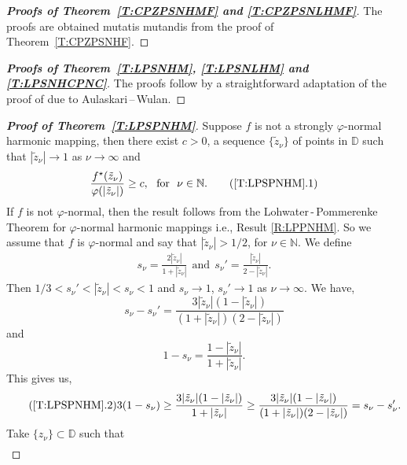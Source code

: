 \documentclass[11pt, reqno]{amsart}
\theoremstyle{definition}
\theoremstyle{remark}
\numberwithin{equation}{section}
\begin{document}
\begin{proof}[{\bf Proofs of Theorem~\ref{T:CPZPSNHMF} and \ref{T:CPZPSNLHMF}}]
The proofs are obtained mutatis mutandis from the 
proof of Theorem~\ref{T:CPZPSNHF}.
\end{proof}
\begin{proof}[{\bf Proofs of Theorem~\ref{T:LPSNHM}, \ref{T:LPSNLHM} and \ref{T:LPSNHCPNC}}]
The proofs follow by a straightforward adaptation of 
the proof of \cite[Theorem 1]{aulaskari-avotlptfsnf-2001} due to Aulaskari\,--\,Wulan.
\end{proof}
\begin{proof}[{\bf Proof of Theorem~\ref{T:LPSPNHM}}]
Suppose $f$ is not a strongly $\varphi$-normal harmonic mapping, then there exist $c>0$, a sequence 
$\{\tilde{z}_{\nu}\}$ of points in $\mathbb D$ such that $|\tilde{z}_{\nu}|\to1$ as $\nu\to\infty$ and 
\begin{equation}\frac{f^\star(\tilde{z}_{\nu})}{\varphi(|\tilde{z}_{\nu}|)}\geq c,\ 
\text{ for }\ \nu\in\mathbb N.\label{LPSPNHM.1}\tag{\ref*{T:LPSPNHM}.1} 
\end{equation}
If $f$ is not $\varphi$-normal, then the result follows from the Lohwater\,-\,Pommerenke Theorem for $\varphi$-normal harmonic mappings i.e., Result 
\ref{R:LPPNHM}. So we assume that $f$ is $\varphi$-normal and say that $|\tilde{z}_{\nu}|>1/2$, for $\nu\in\mathbb N$. We define
\begin{align*}
s_{\nu}=\frac{2|\tilde{z}_{\nu}|}{1+|\tilde{z}_{\nu}|}\ \ \text{and}\ \  s_{\nu}'=\frac{|\tilde{z}_{\nu}|}{2 -|\tilde{z}_{\nu}|}.
\end{align*}
Then $1/3<s_{\nu}'<|\tilde{z}_{\nu}|<s_{\nu}<1$ and $s_{\nu}\to 1$, $s_{\nu}'\to 1$ as $\nu\to \infty$.         
We have,
\begin{equation*}
s_{\nu}-s_{\nu}'=\frac{3|\tilde{z}_{\nu}|(1-|\tilde{z}_{\nu}|)}{(1+|\tilde{z}_{\nu}|)(2-|\tilde{z}_{\nu}|)}
\end{equation*}
and
\begin{equation*}
1-s_{\nu}=\frac{1-|\tilde{z}_{\nu}|}{1+|\tilde{z}_{\nu}|}.
\end{equation*}
This gives us,
\begin{equation}\label{LPSPNHM.2} \tag{\ref*{T:LPSPNHM}.2}
3(1-s_{\nu}) \geq \frac{3|\tilde{z}_{\nu}|(1-|\tilde{z}_{\nu}|)}{1+|\tilde{z}_{\nu}|} \geq \frac{3|\tilde{z}_{\nu}|(1-|\tilde{z}_{\nu}|)}{(1+|\tilde{z}_{\nu}|)(2-|\tilde{z}_{\nu}|)} = s_{\nu}-s_{\nu}'.
\end{equation} 
Take $\{z_{\nu}\}\subset \mathbb{D}$ such that
\begin{align*}

\end{align*}
\end{proof}
\end{document}
